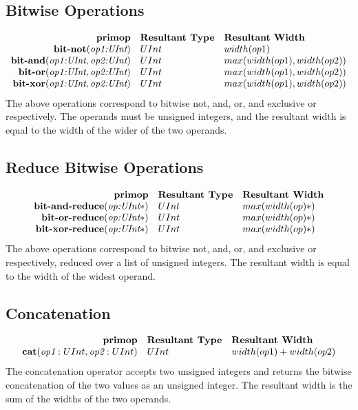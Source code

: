 \documentclass[12pt]{article}
\begin{document}
\subsection{Bitwise Operations}
\[
\begin{array}{rll}
\text{\bf primop} & \text{\bf Resultant Type} & \text{\bf Resultant Width} \\
\text{\bf bit-not}     (\text{\em op1:UInt}) & UInt & width(op1)    \\
\text{\bf bit-and}     (\text{\em op1:UInt}, \text{\em op2:UInt}) & UInt & max(width(op1),width(op2))    \\
\text{\bf bit-or}      (\text{\em op1:UInt}, \text{\em op2:UInt}) & UInt & max(width(op1),width(op2))    \\
\text{\bf bit-xor}     (\text{\em op1:UInt}, \text{\em op2:UInt}) & UInt & max(width(op1),width(op2))    \\
\end{array}
\]
The above operations correspond to bitwise not, and, or, and exclusive or respectively.
The operands must be unsigned integers, and the resultant width is equal to the width of the wider of the two operands. 

\subsection{Reduce Bitwise Operations}
\[
\begin{array}{rll}
\text{\bf primop} & \text{\bf Resultant Type} & \text{\bf Resultant Width} \\
\text{\bf bit-and-reduce}     (\text{\em op:UInt}*) & UInt & max(width(op)*)    \\
\text{\bf bit-or-reduce}      (\text{\em op:UInt}*) & UInt & max(width(op)*)    \\
\text{\bf bit-xor-reduce}     (\text{\em op:UInt}*) & UInt & max(width(op)*)    \\
\end{array}
\]
The above operations correspond to bitwise not, and, or, and exclusive or respectively, reduced over a list of unsigned integers.
The resultant width is equal to the width of the widest operand.

\subsection{Concatenation}
\[
\begin{array}{rll}
\text{\bf primop} & \text{\bf Resultant Type} & \text{\bf Resultant Width} \\
\text{\bf cat}(\text{\em op1}:UInt, \text{\em op2}:UInt)  & UInt & width(op1) + width(op2)    \\
\end{array}
\]
The concatenation operator accepts two unsigned integers and returns the bitwise concatenation of the two values as an unsigned integer.
The resultant width is the sum of the widths of the two operands.
\end{document}
